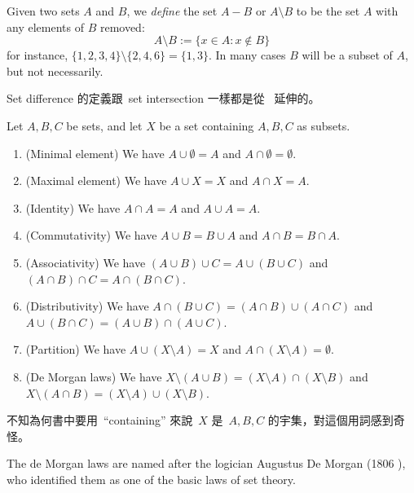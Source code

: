 \begin{definition}  \label{def 3.1.27}
Given two sets \(A\) and \(B\), we \emph{define} the set \(A − B\) or \(A \setminus B\) to be the set \(A\) with any elements of \(B\) removed:
\[
A \setminus B := \{ x \in A : x \notin B \}
\]
for instance, \( \{ 1, 2, 3, 4 \} \setminus \{ 2, 4, 6 \}  = \{ 1, 3 \} \). In many cases \(B\) will be a subset of \(A\), but not necessarily.
\end{definition}

\begin{note}
Set difference 的定義跟\ set intersection 一樣都是從\  延伸的。
\end{note}

\begin{proposition}  \label{prop 3.1.28} 
Let \(A, B, C\) be sets, and let \(X\) be a set containing \(A, B, C\) as subsets.
\begin{enumerate}
    \item (Minimal element) We have \(A \cup \emptyset = A\) and \(A \cap \emptyset = \emptyset\).
    \item (Maximal element) We have \(A \cup X = X\) and \(A \cap X = A\).
    \item (Identity) We have \(A \cap A = A\) and \(A \cup A = A\).
    \item (Commutativity) We have \(A \cup B = B \cup A\) and \(A \cap B = B \cap A\).
    \item (Associativity) We have \((A \cup B) \cup C = A \cup (B \cup C)\) and \((A \cap B) \cap C = A \cap (B \cap C)\).
    \item (Distributivity) We have \(A \cap (B \cup C) = (A \cap B) \cup (A \cap C)\) and \(A \cup (B \cap C) = (A \cup B) \cap (A \cup C)\).
    \item (Partition) We have \(A \cup (X \setminus A) = X\) and \(A \cap (X \setminus A) = \emptyset\).
    \item (De Morgan laws) We have \(X \setminus (A \cup B) = (X \setminus A) \cap (X \setminus B) \) and \(X \setminus (A \cap B) = (X \setminus A) \cup (X \setminus B)\).
\end{enumerate}
\end{proposition}

\begin{note}
不知為何書中要用\ ``containing'' 來說\ \(X\) 是\ \(A, B, C\) 的宇集，對這個用詞感到奇怪。
\end{note}

\begin{remark}\label{remark 3.1.29}
The de Morgan laws are named after the logician Augustus De Morgan (1806 ), who identified them as one of the basic laws of set theory.
\end{remark}

